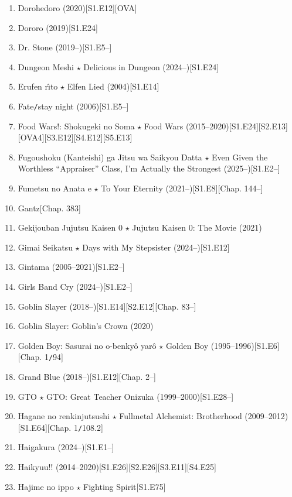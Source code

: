 \documentclass{article}
\begin{document}
\begin{enumerate}
    \item {\sc Dorohedoro} (2020)\hfill[S1.E12][OVA]
    \item {\sc Dororo} (2019)\hfill[S1.E24]
    \item Dr. Stone (2019--)\hfill[S1.E5--]
    \item {\sc Dungeon Meshi $\star$ Delicious in Dungeon} (2024--)\hfill[S1.E24]
    \item {\sc Erufen r\^{\i}to $\star$ Elfen Lied} (2004)\hfill[S1.E14]
    \item Fate{\tt/}stay night (2006)\hfill[S1.E5--]
    \item {\sc Food Wars!: Shokugeki no Soma $\star$ Food Wars} (2015--2020)\hfill[S1.E24][S2.E13][OVA4][S3.E12][S4.E12][S5.E13]
    \item Fugoushoku (Kanteishi) ga Jitsu wa Saikyou Datta $\star$ Even Given the Worthless ``Appraiser'' Class, I'm Actually the Strongest (2025--)\hfill[S1.E2--]
    \item Fumetsu no Anata e $\star$ To Your Eternity (2021--)\hfill[S1.E8][Chap. 144--]
    \item {\sc Gantz}\hfill[Chap. 383]
    \item {\sc Gekijouban Jujutsu Kaisen 0 $\star$ Jujutsu Kaisen 0: The Movie} (2021)
    \item {\sc Gimai Seikatsu $\star$ Days with My Stepsister} (2024--)\hfill[S1.E12]
    \item Gintama (2005--2021)\hfill[S1.E2--]
    \item Girls Band Cry (2024--)\hfill[S1.E2--]
    \item {\sc Goblin Slayer} (2018--)\hfill[S1.E14][S2.E12][Chap. 83--]
    \item {\sc Goblin Slayer: Goblin's Crown} (2020)
    \item {\sc Golden Boy: Sasurai no o-benky\^o yar\^o $\star$ Golden Boy} (1995--1996)\hfill[S1.E6][Chap. 1{\tt/}94]
    \item Grand Blue (2018--)\hfill[S1.E12][Chap. 2--]
    \item GTO $\star$ GTO: Great Teacher Onizuka (1999--2000)\hfill[S1.E28--]
    \item {\sc Hagane no renkinjutsushi $\star$ Fullmetal Alchemist: Brotherhood} (2009--2012)\hfill[S1.E64][Chap. 1{\tt/}108.2]
    \item Haigakura (2024--)\hfill[S1.E1--]
    \item {\sc Haikyuu!!} (2014--2020)\hfill[S1.E26][S2.E26][S3.E11][S4.E25]
    \item {\sc Hajime no ippo $\star$ Fighting Spirit}\hfill[S1.E75]

\end{enumerate}
\end{document}
